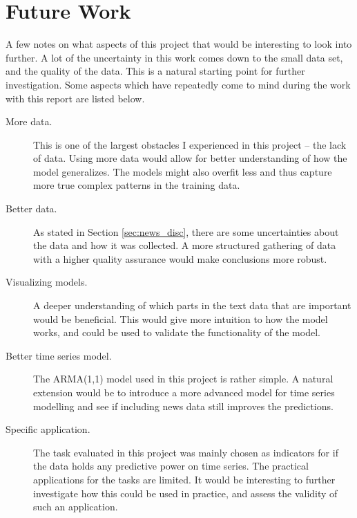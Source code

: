 \section{Future Work}

A few notes on what aspects of this project that would be interesting to look into further. A lot of the uncertainty in this work comes down to the small data set, and the quality of the data. This is a natural starting point for further investigation. Some aspects which have repeatedly come to mind during the work with this report are listed below. 

\begin{description}
    \item[More data.] This is one of the largest obstacles I experienced in this project -- the lack of data. Using more data would allow for better understanding of how the model generalizes. The models might also overfit less and thus capture more true complex patterns in the training data. 
    \item[Better data. ] As stated in Section \ref{sec:news_disc}, there are some uncertainties about the data and how it was collected. A more structured gathering of data with a higher quality assurance would make conclusions more robust. 
    \item[Visualizing models.] A deeper understanding of which parts in the text data that are important would be beneficial. This would give more intuition to how the model works, and could be used to validate the functionality of the model.
    \item[Better time series model.] The ARMA(1,1) model used in this project is rather simple. A natural extension would be to introduce a more advanced model for time series modelling and see if including news data still improves the predictions. 
    \item[Specific application.] The task evaluated in this project was mainly chosen as indicators for if the data holds any predictive power on time series. The practical applications for the tasks are limited. It would be interesting to further investigate how this could be used in practice, and assess the validity of such an application. 
\end{description}
